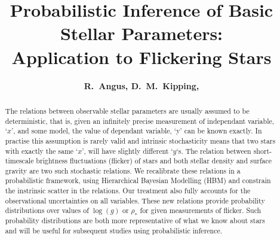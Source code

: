\documentclass[apjl]{emulateapj}
\newcommand{\titledag}{$\dagger$}
\newcommand{\titledag}{\dagger}
\begin{document}
\title {Probabilistic Inference of Basic Stellar Parameters:\\
Application to Flickering Stars %
\altaffilmark{\titledag}}

\author{
	{\bf	R.~Angus,
		D.~M.~Kipping,
	}
}







\begin{abstract}

The relations between observable stellar parameters are usually assumed to be
deterministic, that is, given an infinitely precise measurement of independant
variable, `$x$', and some model, the value of dependant variable, `y' can be
known exactly.
In practise this assumption is rarely valid and intrinsic stochasticity means
that two stars with exactly the same `$x$', will have slightly different
`$y$`s.
The relation between short-timescale brightness fluctuations (flicker) of stars
and both stellar density and surface gravity \citep{bastien:2013} are two such
stochastic relations.
We recalibrate these relations in a probabilistic framework, using
Hierarchical Bayesian Modelling (HBM) and constrain the instrinsic scatter in
the relations.
Our treatment also fully accounts for the observational uncertainties on all
variables.
These new relations provide probability distributions over values of $\log(g)$
or $\rho_*$ for given measurements of flicker.
Such probability distributions are both more representative of what we know
about stars and will be useful for subsequent studies using probabilistic
inference.

\end{abstract}

\end{document}
